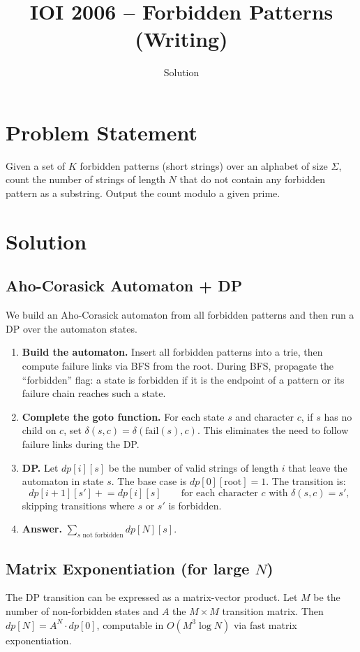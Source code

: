 \documentclass[11pt,a4paper]{article}
\title{IOI 2006 -- Forbidden Patterns (Writing)}
\author{Solution}
\date{}
\begin{document}
\maketitle

\section{Problem Statement}
Given a set of $K$ forbidden patterns (short strings) over an alphabet of size $\Sigma$, count the number of strings of length $N$ that do not contain any forbidden pattern as a substring. Output the count modulo a given prime.

\section{Solution}

\subsection{Aho-Corasick Automaton + DP}
We build an Aho-Corasick automaton from all forbidden patterns and then run a DP over the automaton states.

\begin{enumerate}
    \item \textbf{Build the automaton.} Insert all forbidden patterns into a trie, then compute failure links via BFS from the root. During BFS, propagate the ``forbidden'' flag: a state is forbidden if it is the endpoint of a pattern or its failure chain reaches such a state.
    \item \textbf{Complete the goto function.} For each state $s$ and character $c$, if $s$ has no child on $c$, set $\delta(s,c) = \delta(\text{fail}(s), c)$. This eliminates the need to follow failure links during the DP.
    \item \textbf{DP.} Let $dp[i][s]$ be the number of valid strings of length $i$ that leave the automaton in state $s$. The base case is $dp[0][\text{root}] = 1$. The transition is:
    \[
    dp[i+1][s'] \mathrel{+}= dp[i][s] \qquad \text{for each character } c \text{ with } \delta(s,c) = s',
    \]
    skipping transitions where $s$ or $s'$ is forbidden.
    \item \textbf{Answer.} $\displaystyle\sum_{s \text{ not forbidden}} dp[N][s]$.
\end{enumerate}

\subsection{Matrix Exponentiation (for large $N$)}
The DP transition can be expressed as a matrix-vector product. Let $M$ be the number of non-forbidden states and $A$ the $M \times M$ transition matrix. Then $dp[N] = A^N \cdot dp[0]$, computable in $O(M^3 \log N)$ via fast matrix exponentiation.
\end{document}
